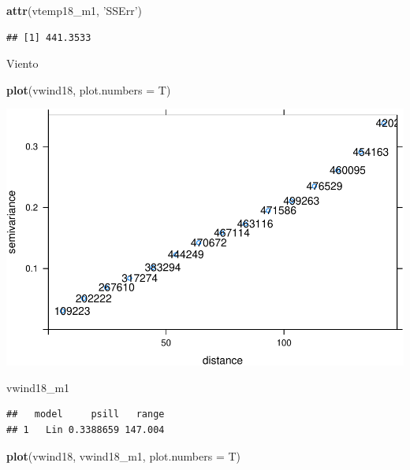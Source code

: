 \documentclass[11pt,]{article}
\newenvironment{Shaded}{\begin{snugshade}}{\end{snugshade}}
\newcommand{\KeywordTok}[1]{\textcolor[rgb]{0.13,0.29,0.53}{\textbf{#1}}}
\newcommand{\DataTypeTok}[1]{\textcolor[rgb]{0.13,0.29,0.53}{#1}}
\newcommand{\StringTok}[1]{\textcolor[rgb]{0.31,0.60,0.02}{#1}}
\newcommand{\NormalTok}[1]{#1}
\begin{document}
\begin{Shaded}
\begin{Highlighting}[]
\KeywordTok{attr}\NormalTok{(vtemp18_m1, }\StringTok{'SSErr'}\NormalTok{)}
\end{Highlighting}
\end{Shaded}

\begin{verbatim}
## [1] 441.3533
\end{verbatim}

Viento

\begin{Shaded}
\begin{Highlighting}[]
\KeywordTok{plot}\NormalTok{(vwind18, }\DataTypeTok{plot.numbers =}\NormalTok{ T)}
\end{Highlighting}
\end{Shaded}

\includegraphics{proyecto_files/figure-latex/unnamed-chunk-42-1.pdf}

\begin{Shaded}
\begin{Highlighting}[]
\NormalTok{vwind18_m1}
\end{Highlighting}
\end{Shaded}

\begin{verbatim}
##   model     psill   range
## 1   Lin 0.3388659 147.004
\end{verbatim}

\begin{Shaded}
\begin{Highlighting}[]
\KeywordTok{plot}\NormalTok{(vwind18, vwind18_m1, }\DataTypeTok{plot.numbers =}\NormalTok{ T)}
\end{Highlighting}
\end{Shaded}
\end{document}
